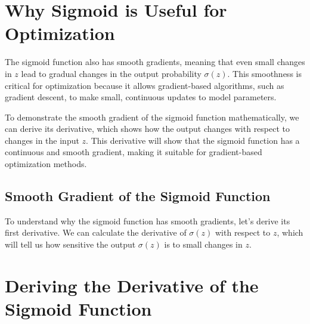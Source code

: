\documentclass[
  12 pt,
  a4paper,
]{book}
\numberwithin{equation}{section}
\theoremstyle{plain}      %
\theoremstyle{definition} %
\theoremstyle{remark}     %
\theoremstyle{note}         %
\begin{document}
\hypertarget{why-sigmoid-is-useful-for-optimization}{%
\section{Why Sigmoid is Useful for
Optimization}\label{why-sigmoid-is-useful-for-optimization}}

The sigmoid function also has smooth gradients, meaning that even small
changes in \(z\) lead to gradual changes in the output probability
\(\sigma(z)\). This smoothness is critical for optimization because it
allows gradient-based algorithms, such as gradient descent, to make
small, continuous updates to model parameters.

To demonstrate the smooth gradient of the sigmoid function
mathematically, we can derive its derivative, which shows how the output
changes with respect to changes in the input \(z\). This derivative will
show that the sigmoid function has a continuous and smooth gradient,
making it suitable for gradient-based optimization methods.

\hypertarget{smooth-gradient-of-the-sigmoid-function}{%
\subsection{Smooth Gradient of the Sigmoid
Function}\label{smooth-gradient-of-the-sigmoid-function}}

To understand why the sigmoid function has smooth gradients, let's
derive its first derivative. We can calculate the derivative of
\(\sigma(z)\) with respect to \(z\), which will tell us how sensitive
the output \(\sigma(z)\) is to small changes in \(z\).

\hypertarget{deriving-the-derivative-of-the-sigmoid-function}{%
\section{Deriving the Derivative of the Sigmoid
Function}\label{deriving-the-derivative-of-the-sigmoid-function}}
\end{document}
